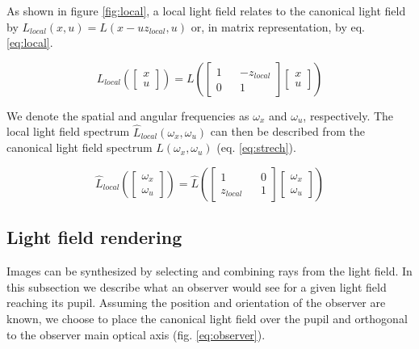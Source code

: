 \documentclass[acmtog,review,anonymous]{acmart}
\begin{document}
As shown in figure \ref{fig:local}, a local light field relates to the canonical light field by $L_{local}(x, u) = L(x - uz_{local}, u)$ or, in matrix representation, by eq. \ref{eq:local}.

\begin{equation} \label{eq:local}
L_{local}\left(\begin{bmatrix}x\\u\end{bmatrix}\right) =
L\left(\begin{bmatrix}1 && -z_{local}\\0 && 1\end{bmatrix} \begin{bmatrix}x\\u\end{bmatrix}\right)
\end{equation}

We denote the spatial and angular frequencies as $\omega_{x}$ and $\omega_{u}$, respectively. The local light field spectrum $\hat{L}_{local}(\omega_{x}, \omega_{u})$ can then be described from the canonical light field spectrum $\hat{L}(\omega_{x}, \omega_{u})$ (eq. \ref{eq:strech}).

\begin{equation} \label{eq:strech}
\hat{L}_{local}\left(\begin{bmatrix}\omega_{x}\\\omega_{u}\end{bmatrix}\right) =
\hat{L}\left(\begin{bmatrix}1 && 0\\z_{local} && 1\end{bmatrix} \begin{bmatrix}\omega_{x}\\\omega_{u}\end{bmatrix}\right)
\end{equation}

\subsection{Light field rendering}

Images can be synthesized by selecting and combining rays from the light field. In this subsection we describe what an observer would see for a given light field reaching its pupil. Assuming the position and orientation of the observer are known, we choose to place the canonical light field over the pupil and orthogonal to the observer main optical axis (fig. \ref{eq:observer}).
\end{document}
